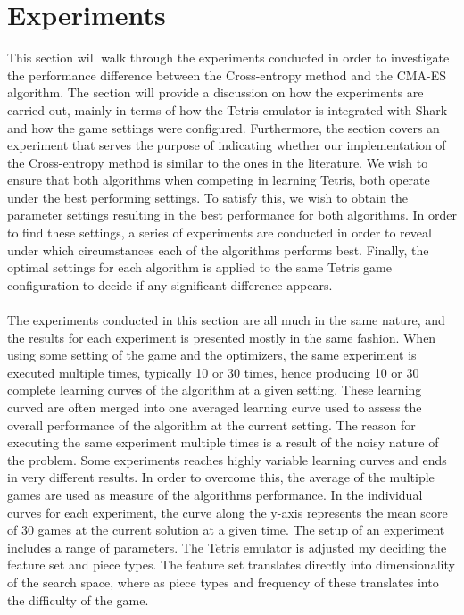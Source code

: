 \section{Experiments}
This section will walk through the experiments conducted in order to investigate the performance
difference between the Cross-entropy method and the CMA-ES algorithm. The section will provide a discussion on how the experiments are carried out, mainly
in terms of how the Tetris emulator is integrated with Shark and how the game settings were configured.
Furthermore, the section covers an experiment that serves the purpose of indicating whether our implementation
of the Cross-entropy method is similar to the ones in the literature. 
We wish to ensure that both algorithms when competing in learning Tetris, both operate under the 
best performing settings. To satisfy this, we wish to obtain the parameter settings resulting in the 
best performance
for both algorithms. In order to find these settings, a series of experiments are conducted 
in order to reveal under which circumstances each of the algorithms performs best.
Finally, the optimal settings for each algorithm is applied to
the same Tetris game configuration to decide if any significant difference appears.\\
\\
The experiments conducted in this section are all much in the same nature, and the 
results for each experiment is presented mostly in the same fashion. When using some setting 
of the game and the optimizers, the same experiment is executed multiple times, typically 
10 or 30 times, hence producing 10 or 30 complete learning curves of the algorithm at a given setting.
These learning curved are often merged into one averaged learning curve used to assess the overall
performance of the algorithm at the current setting. 
The reason for executing the same experiment multiple times is a result of the noisy nature of the problem. Some experiments reaches highly variable learning curves and ends in very different results. In order to overcome this, the average of the multiple games are used as measure of the algorithms performance.
In the individual curves for each experiment, the curve along the y-axis represents the mean score of 30 games at the current solution at a given time.
The setup of an experiment includes a range of parameters. The Tetris emulator is adjusted my deciding the feature set and piece types. The feature set translates directly into dimensionality of the search space, where as piece types and frequency of these translates into the difficulty of the game.
